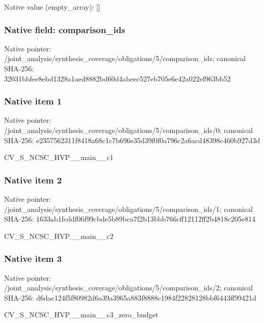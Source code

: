 \documentclass[10pt,a4paper]{article}
\begin{document}
Native value (empty\_\allowbreak{}array): []

\subsubsection{Native field: comparison\_\allowbreak{}ids}
Native pointer: /joint\_\allowbreak{}analysis/synthesis\_\allowbreak{}coverage/obligations/5/comparison\_\allowbreak{}ids; canonical SHA-256: 32031bbfee8ebd1328a1aed8882bd60d4abeec527eb705e6e42a022ef963bb52

\subsubsection{Native item 1}
Native pointer: /joint\_\allowbreak{}analysis/synthesis\_\allowbreak{}coverage/obligations/5/comparison\_\allowbreak{}ids/0; canonical SHA-256: e2357562311f8418a68c1c7b696e35d39f0f0a796c2a6acd48398c460b927d3d

\begingroup\raggedright\sloppy CV\_\allowbreak{}S\_\allowbreak{}NCSC\_\allowbreak{}HVP\_\allowbreak{}\_\allowbreak{}main\_\allowbreak{}\_\allowbreak{}c1\par\endgroup

\subsubsection{Native item 2}
Native pointer: /joint\_\allowbreak{}analysis/synthesis\_\allowbreak{}coverage/obligations/5/comparison\_\allowbreak{}ids/1; canonical SHA-256: 1633ab1fcddf06f99cbde5b89bca7f2b13bbb766cff12112ff2b4818c205e814

\begingroup\raggedright\sloppy CV\_\allowbreak{}S\_\allowbreak{}NCSC\_\allowbreak{}HVP\_\allowbreak{}\_\allowbreak{}main\_\allowbreak{}\_\allowbreak{}c2\par\endgroup

\subsubsection{Native item 3}
Native pointer: /joint\_\allowbreak{}analysis/synthesis\_\allowbreak{}coverage/obligations/5/comparison\_\allowbreak{}ids/2; canonical SHA-256: d6dac124f5f80982d6a39a3965a883f8888c1984f22828128bbf6443ff99421d

\begingroup\raggedright\sloppy CV\_\allowbreak{}S\_\allowbreak{}NCSC\_\allowbreak{}HVP\_\allowbreak{}\_\allowbreak{}main\_\allowbreak{}\_\allowbreak{}c3\_\allowbreak{}zero\_\allowbreak{}budget\par\endgroup
\end{document}

